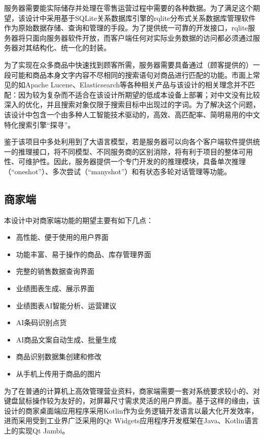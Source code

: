 服务器需要能实际储存并处理在零售运营过程中需要的各种数据。为了满足这个期望，该设计中采用基于SQLite关系数据库引擎的rqlite分布式关系数据库管理软件作为原始数据存储、查询和管理的手段。为了提供统一可靠的开发接口，rqlite服务器将只面向服务器软件开放，而客户端任何对实际业务数据的访问都必须通过服务器对其结构化、统一化的封装。

为了实现在众多商品中快速找到顾客所需，服务器需要具备通过（顾客提供的）一段可能和商品本身文字内容不尽相同的搜索语句对商品进行匹配的功能。市面上常见的如Apache Lucene、Elasticsearch等各种相关产品与该设计的相关理念并不匹配：因为较为复杂而不适合在该设计所期望的低成本设备上部署；对中文没有比较深入的优化，并且搜索对象仅限于搜索目标中出现过的字词。为了解决这个问题，该设计中包含一个由多种人工智能技术驱动的，高效、高匹配率、简明易用的中文特化搜索引擎“探寻”。

鉴于该项目中多处利用到了大语言模型，若是服务器可以向各个客户端软件提供统一的推理接口，将不同模型、不同服务商的区别消除，将有利于项目的整体可用性、可维护性。因此，服务器提供一个专门开发的的推理模块，具备单次推理（“oneshot”）、多次尝试（“manyshot”）和有状态多轮对话管理等功能。

\subsection{商家端}

本设计中对商家端功能的期望主要有如下几点：

\begin{itemize}
    \item 高性能、便于使用的用户界面
    \item 功能丰富、易于操作的商品、库存管理界面
    \item 完整的销售数据查询界面
    \item 业绩图表生成、展示界面
    \item 业绩图表AI智能分析、运营建议
    \item AI条码识别点货
    \item AI商品文案自动生成、批量生成
    \item 商品识别数据集创建和修改
    \item 从手机上传用于商品的图片
\end{itemize}

为了在普通的计算机上高效管理营业资料，商家端需要一套对系统要求较小的、对键盘鼠标操作较为友好的，对屏幕尺寸需求灵活的用户界面。基于这样的缘由，该设计的商家桌面端应用程序采用Kotlin作为业务逻辑开发语言以最大化开发效率，进而采用受到工业界广泛采用的Qt Widgets应用程序开发框架在Java、Kotlin语言上的实现Qt Jambi。

